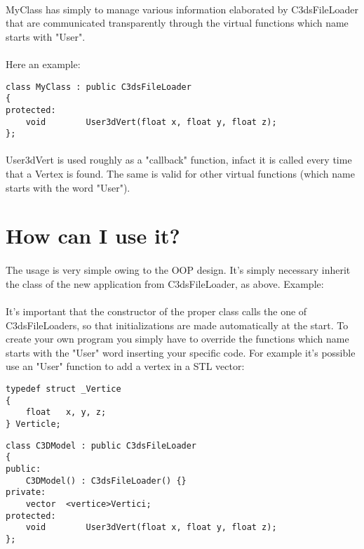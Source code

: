 \documentclass[11pt,a4paper]{article}
\begin{document}
\paragraph*{}
MyClass has simply to manage various information elaborated by C3dsFileLoader that are communicated transparently through the virtual functions which name starts with "User".\\
\\
Here an example:

\begin{verbatim}
class MyClass : public C3dsFileLoader
{
protected:
	void		User3dVert(float x, float y, float z);
};
\end{verbatim}

\paragraph*{}
User3dVert is used roughly as a "callback" function, infact it is called every time that a Vertex is found. The same is valid for other virtual functions (which name starts with the word "User").

\section*{How can I use it?}

\paragraph*{}
The usage is very simple owing to the OOP design. It's simply necessary inherit the class of the new application from C3dsFileLoader, as above.
\pagebreak
Example:

\paragraph*{}
It's important that the constructor of the proper class calls the one of C3dsFileLoaders, so that initializations are made automatically at the start.
To create your own program you simply have to override the functions which name starts with the "User" word inserting your specific code. 
For example it's possible use an "User" function to add a vertex in a STL vector:

\begin{verbatim}
typedef struct _Vertice
{
	float	x, y, z;
} Verticle;
\end{verbatim}

\begin{verbatim}
class C3DModel : public C3dsFileLoader
{
public:
	C3DModel() : C3dsFileLoader() {}
private:
	vector	<vertice>Vertici;
protected:
	void		User3dVert(float x, float y, float z);
};
\end{verbatim}
\end{document}
